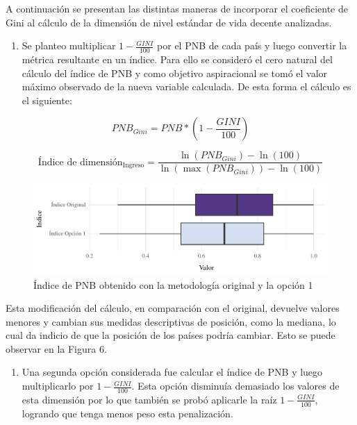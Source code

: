 \documentclass[
  10pt,
]{article}
\providecommand{\tightlist}{%
  \setlength{\itemsep}{0pt}\setlength{\parskip}{0pt}}
\begin{document}
A continuación se presentan las distintas maneras de incorporar el
coeficiente de Gini al cálculo de la dimensión de nivel estándar de vida
decente analizadas.

\begin{enumerate}
\def\labelenumi{\arabic{enumi}.}
\tightlist
\item
  Se planteo multiplicar \(1-\frac{GINI}{100}\) por el PNB de cada país
  y luego convertir la métrica resultante en un índice. Para ello se
  consideró el cero natural del cálculo del índice de PNB y como
  objetivo aspiracional se tomó el valor máximo observado de la nueva
  variable calculada. De esta forma el cálculo es el siguiente:
\end{enumerate}

\[PNB_{Gini} = PNB * \left(1-\frac{GINI}{100}\right)\]

\[\text{Índice de dimensión}_\text{Ingreso}=\frac{\ln(PNB_{Gini})-\ln(100)}{\ln(\max(PNB_{Gini}))-\ln(100)}\]

\begin{figure}
\centering
\includegraphics{Informe_files/figure-latex/Figura6-1.pdf}
\caption{Índice de PNB obtenido con la metodología original y la opción
1}
\end{figure}

Esta modificación del cálculo, en comparación con el original, devuelve
valores menores y cambian sus medidas descriptivas de posición, como la
mediana, lo cual da indicio de que la posición de los países podría
cambiar. Esto se puede observar en la Figura 6.

\begin{enumerate}
\def\labelenumi{\arabic{enumi}.}
\setcounter{enumi}{1}
\tightlist
\item
  Una segunda opción considerada fue calcular el índice de PNB y luego
  multiplicarlo por \(1-\frac{GINI}{100}\). Esta opción disminuía
  demasiado los valores de esta dimensión por lo que también se probó
  aplicarle la raíz \(1-\frac{GINI}{100}\), logrando que tenga menos
  peso esta penalización.
\end{enumerate}
\end{document}
